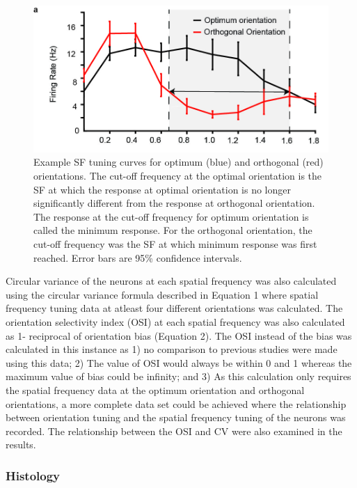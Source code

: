 		\begin{figure}[H]
		
		\includegraphics[width=\linewidth]{superiorcolliculus/SCOptOrth.jpg}
		\caption{Example SF tuning curves for optimum (blue) and orthogonal (red) orientations. The cut-off frequency at the optimal orientation is the SF at which the response at optimal orientation is no longer significantly different from the response at orthogonal orientation. The response at the cut-off frequency for optimum orientation is called the minimum response. For the orthogonal orientation, the cut-off frequency was the SF at which minimum response was first reached. Error bars are 95\% confidence intervals.}
		\label{fig:scoptorth}
		\end{figure}
	
	Circular variance of the neurons at each spatial frequency was also calculated using the circular variance formula described in Equation 1 where spatial frequency tuning data at atleast four different orientations was calculated. The orientation selectivity index (OSI) at each spatial frequency was also calculated as 1- reciprocal of orientation bias (Equation 2). The OSI instead of the bias was calculated in this instance as 1) no comparison to previous studies were made using this data; 2) The value of OSI would always be within 0 and 1 whereas the maximum value of bias could be infinity; and 3) As this calculation only requires the spatial frequency data at the optimum orientation and orthogonal orientations, a more complete data set could be achieved where the relationship between orientation tuning and the spatial frequency tuning of the neurons was recorded. The relationship between the OSI and CV were also examined in the results.
	
	\subsubsection{Histology}
	

